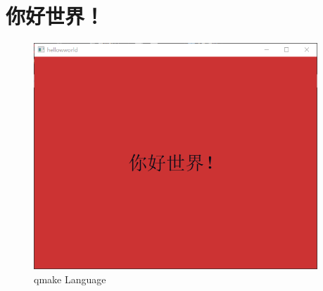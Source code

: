 ﻿





\FloatBarrier
\section{
你好世界！
}\label{s100410}




\begin{figure}[ht] %
\centering %
\includegraphics[width=0.95\textwidth]{../chapter01/hellowworld/the_app.png} %
\caption{qmake Language} %
\label{p000006} %
\end{figure}


















